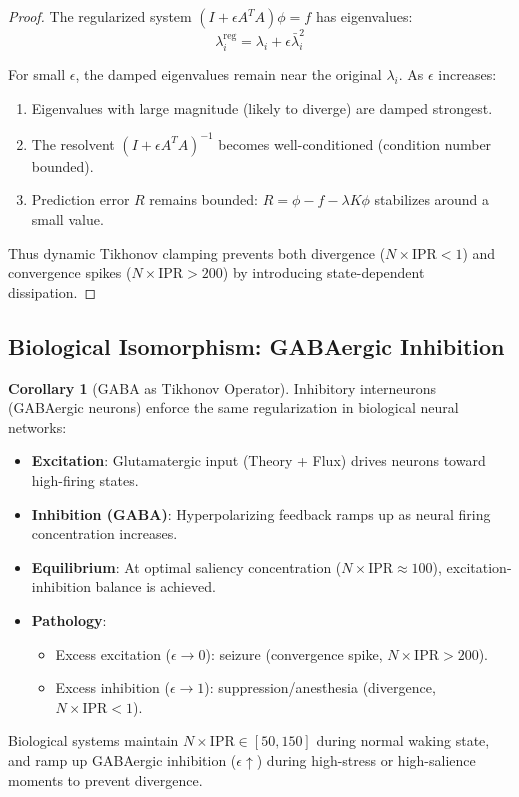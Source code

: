 \documentclass[11pt,oneside]{article}
\theoremstyle{definition}
\newtheorem{corollary}[theorem]{Corollary}
\begin{document}
\begin{proof}
The regularized system $(I + \epsilon A^T A)\phi = f$ has eigenvalues:
\[
\lambda_i^{\text{reg}} = \lambda_i + \epsilon \bar{\lambda}_i^2
\]

For small $\epsilon$, the damped eigenvalues remain near the original $\lambda_i$. As $\epsilon$ increases:
\begin{enumerate}
  \item Eigenvalues with large magnitude (likely to diverge) are damped strongest.
  \item The resolvent $(I + \epsilon A^T A)^{-1}$ becomes well-conditioned (condition number bounded).
  \item Prediction error $R$ remains bounded: $R = \phi - f - \lambda K\phi$ stabilizes around a small value.
\end{enumerate}

Thus dynamic Tikhonov clamping prevents both divergence ($N \times \text{IPR} < 1$) and convergence spikes ($N \times \text{IPR} > 200$) by introducing state-dependent dissipation.
\end{proof}

\subsection{Biological Isomorphism: GABAergic Inhibition}

\begin{corollary}[GABA as Tikhonov Operator]
Inhibitory interneurons (GABAergic neurons) enforce the same regularization in biological neural networks:

\begin{itemize}
  \item \textbf{Excitation}: Glutamatergic input (Theory + Flux) drives neurons toward high-firing states.
  \item \textbf{Inhibition (GABA)}: Hyperpolarizing feedback ramps up as neural firing concentration increases.
  \item \textbf{Equilibrium}: At optimal saliency concentration ($N \times \text{IPR} \approx 100$), excitation-inhibition balance is achieved.
  \item \textbf{Pathology}:
  \begin{itemize}
    \item Excess excitation ($\epsilon \to 0$): seizure (convergence spike, $N \times \text{IPR} > 200$).
    \item Excess inhibition ($\epsilon \to 1$): suppression/anesthesia (divergence, $N \times \text{IPR} < 1$).
  \end{itemize}
\end{itemize}

Biological systems maintain $N \times \text{IPR} \in [50, 150]$ during normal waking state, and ramp up GABAergic inhibition ($\epsilon \uparrow$) during high-stress or high-salience moments to prevent divergence.
\end{corollary}
\end{document}
